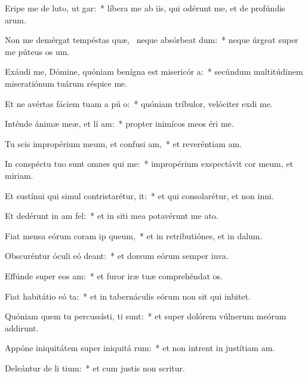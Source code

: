 \item Eripe me de luto, ut  gar:~* líbera me ab iis, qui odérunt me, et de profúndis arum.
\item Non me demérgat tempéstas quæ,~\pscross{} neque absórbeat  dum:~* neque úrgeat super me púteus os um.
\item Exáudi me, Dómine, quóniam benígna est misericór a:~* secúndum multitúdinem miseratiónum tuárum réspice  me.
\item Et ne avértas fáciem tuam a pú o:~* quóniam tríbulor, velóciter exdi me.
\item Inténde ánimæ meæ, et lí am:~* propter inimícos meos éri me.
\item Tu scis impropérium meum, et confusi am,~* et reveréntiam am.
\item In conspéctu tuo sunt omnes qui  me:~* impropérium exspectávit cor meum, et miriam.
\item Et sustínui qui simul contristarétur,   it:~* et qui consolarétur, et non inni.
\item Et dedérunt in  am fel:~* et in siti mea potavérunt me ato.
\item Fiat mensa eórum coram ip  queum,~* et in retributiónes, et in dalum.
\item Obscuréntur óculi eó  deant:~* et dorsum eórum semper inva.
\item Effúnde super eos  am:~* et furor iræ tuæ comprehéndat os.
\item Fiat habitátio eó ta:~* et in tabernáculis eórum non sit qui inbitet.
\item Quóniam quem tu percussísti, ti sunt:~* et super dolórem vúlnerum meórum addirunt.
\item Appóne iniquitátem super iniquitá rum:~* et non intrent in justítiam am.
\item Deleántur de li tium:~* et cum justis non scritur.
